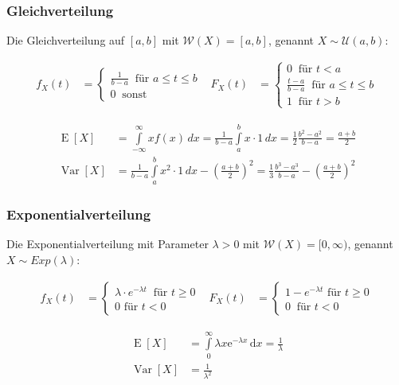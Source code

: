 \documentclass[25pt]{sciposter}
\newcommand{\W}{\mathcal{W}}
\newcommand{\U}{\mathcal{U}}
\newcommand{\Var}{\operatorname{Var}}
\newcommand{\E}{\operatorname{E}}
\begin{document}
\begin{multicols}{3}
\subsubsection*{Gleichverteilung}
Die Gleichverteilung auf $[a,b]$ mit $\W(X)=[a,b]$, genannt $X\sim\U(a,b)$:

\begin{align*}
	f_X(t) &= \begin{cases}
	\frac{1}{b-a} \ \text{ für } a \leq t \leq b\\
	0 \ \text{ sonst}
	\end{cases}
	& 
	F_X(t) &= \begin{cases}
	0 \ \text{ für } t<a \\
	\frac{t-a}{b-a} \ \text{ für } a \leq t \leq b\\
	1 \ \text{ für } t > b
	\end{cases}
\end{align*}


\begin{align*}
\E[X] &= {\displaystyle\int \limits _{-\infty }^{\infty }xf(x)\,dx={\frac {1}{b-a}}\int \limits _{a}^{b}x\cdot 1\,dx={\frac {1}{2}}{\frac {b^{2}-a^{2}}{b-a}}={\frac {a+b}{2}}} \\ \Var[X] &={\frac {1}{b-a}}\int \limits _{a}^{b}{x^{2}\cdot 1\,dx}-\left({\frac {a+b}{2}}\right)^{2}={\frac {1}{3}}{\frac {b^{3}-a^{3}}{b-a}}-\left({\frac {a+b}{2}}\right)^{2}
\end{align*}




\subsubsection*{Exponentialverteilung}
Die Exponentialverteilung mit Parameter $\lambda > 0$ mit $\W(X)=[0,\infty)$, genannt $X\sim Exp(\lambda)$:

\begin{align*}
f_X(t) &= \begin{cases}
\lambda \cdot e^{-\lambda t} \ \text{ für } t \geq 0\\
0 \text{ für } t < 0
\end{cases}
& 
F_X(t) &= \begin{cases}
1-e^{-\lambda t} \text{ für } t\geq 0\\
0 \ \text{ für } t < 0
\end{cases}
\end{align*}

\begin{align*}
	\E[X]&=\int \limits _{0}^{\infty }\lambda x{\mathrm  {e}}^{{-\lambda x}}\,{\mathrm  {d}}x={\frac  {1}{\lambda }}\\
	\Var[X] &= \frac{1}{\lambda^2}
\end{align*}


\end{multicols}
\end{document}
